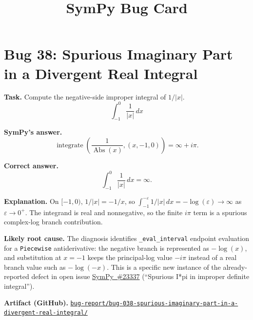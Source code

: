 \documentclass[11pt]{article}
\title{SymPy Bug Card}
\author{}
\date{}
\newcommand{\SymPy}{SymPy}
\newcommand{\artifactrepo}{https://github.com/TODO-org/TODO-repo}
\newcommand{\bugbundle}[1]{\href{\artifactrepo/tree/main/bug-report/#1}{\nolinkurl{bug-report/#1/}}}
\begin{document}
\setlength{\emergencystretch}{2em}

\maketitle

\section*{Bug 38: Spurious Imaginary Part in a Divergent Real Integral}

\begin{counterexamplebox}
\textbf{Task.} Compute the negative-side improper integral of \(1/|x|\).
\[
  \int_{-1}^{0} \frac{1}{|x|}\,dx
\]

\medskip
\textbf{SymPy's answer.}
\[
  \operatorname{integrate}\!\left(\frac{1}{\operatorname{Abs}(x)},(x,-1,0)\right)
  = \infty + i\pi.
\]

\medskip
\textbf{Correct answer.}
\[
  \int_{-1}^{0} \frac{1}{|x|}\,dx = \infty.
\]

\medskip
\textbf{Explanation.} On \([-1,0)\), \(1/|x|=-1/x\), so
\(\int_{-1}^{-\varepsilon}1/|x|\,dx=-\log(\varepsilon)\to\infty\) as
\(\varepsilon\to0^+\).  The integrand is real and nonnegative, so the finite
\(i\pi\) term is a spurious complex-log branch contribution.

\medskip
\textbf{Likely root cause.} The diagnosis identifies
\texttt{\_eval\_interval} endpoint evaluation for a \texttt{Piecewise}
antiderivative: the negative branch is represented as \(-\log(x)\), and
substitution at \(x=-1\) keeps the principal-log value \(-i\pi\) instead of a
real branch value such as \(-\log(-x)\).  This is a specific new instance of
the already-reported defect in open issue
\href{https://github.com/sympy/sympy/issues/23337}{\SymPy{}~\#23337}
(``Spurious I*pi in improper definite integral'').

\medskip
\textbf{Artifact (GitHub).} \bugbundle{bug-038-spurious-imaginary-part-in-a-divergent-real-integral}
\end{counterexamplebox}
\end{document}
